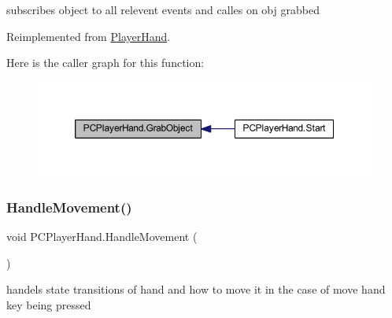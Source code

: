 subscribes object to all relevent events and calles on obj grabbed 



Reimplemented from \mbox{\hyperlink{class_player_hand_a64a86af904a77f4a0b92d72bd5fdf43c}{Player\+Hand}}.

Here is the caller graph for this function\+:
\nopagebreak
\begin{figure}[H]
\begin{center}
\leavevmode
\includegraphics[width=350pt]{class_p_c_player_hand_a08da28b459501727d269733569559c24_icgraph}
\end{center}
\end{figure}
\mbox{\label{class_p_c_player_hand_a81d7137403650fb8da125b6356d50496}} 
\subsubsection{\texorpdfstring{Handle\+Movement()}{HandleMovement()}}
{\footnotesize\ttfamily void P\+C\+Player\+Hand.\+Handle\+Movement (\begin{DoxyParamCaption}{ }\end{DoxyParamCaption})\hspace{0.3cm}{\ttfamily [private]}}



handels state transitions of hand and how to move it in the case of move hand key being pressed 

